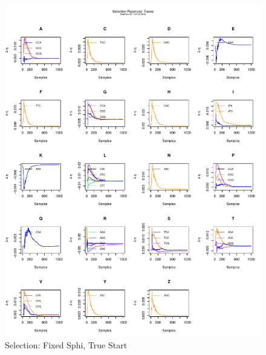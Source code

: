 \documentclass[11pt]{labbook}
\begin{document}
    \begin{figure}
        \centering
        \includegraphics[scale=.65]{FONSE_Plots/2016/November_8/fixedSphi_sim_sel}
        \caption{Selection: Fixed Sphi, True Start}
        \label{fig:NOV8_F.S.SEL}
    \end{figure}
\end{document}
